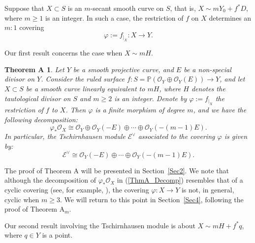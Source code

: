 \documentclass[a4paper,12pt]{amsart}
\newtheorem*{thmA}{Theorem A}
\begin{document}
Suppose that $X \subset S$ is an $m$-secant smooth curve on $S$, that is, $X \sim mY_0 + f^{\ast} D$, where $m \geq 1$ is an integer. In such a case,  the restriction of $f$ on $X$ determines an $m:1$ covering
\begin{equation*}\label{varphi_X_to_Y}
 \varphi := f_{|_X} : X \to Y .
\end{equation*}

Our first result concerns the case when $X \sim mH$.

\begin{thmA}\label{thmARef}
Let $Y$ be a smooth projective curve, and $E$ be a non-special divisor on $Y$. Consider the ruled surface $f : S = \mathbb{P} (\mathcal{O}_Y \oplus \mathcal{O}_Y (E)) \to Y$, and let $X \subset S$ be a smooth curve linearly equivalent to $mH$, where $H$ denotes the tautological divisor on $S$ and $m \geq 2$ is an integer. Denote by $\varphi := f_{|_X}$ the restriction of $f$ to $X$. Then $\varphi$ is a finite morphism of degree $m$, and we have the following decomposition:
 \begin{equation}\label{ThmA_Decomp}
  \varphi_{\ast} \mathcal{O}_X \cong \mathcal{O}_Y \oplus \mathcal{O}_Y (-E)  \oplus \cdots \oplus \mathcal{O}_Y (-(m-1)E) .
 \end{equation}
In particular, the Tschirnhausen module $\mathcal{E}^{\vee}$ associated to the covering $\varphi$ is given by:
\[
 \mathcal{E}^{\vee} \cong \mathcal{O}_Y (-E)  \oplus \cdots \oplus \mathcal{O}_Y (-(m-1)E) .
\]
\end{thmA}

\medskip

The proof of {\rm Theorem A} will be presented in Section~{\ref{Sec2}}. We note that although the decomposition of $\varphi_{\ast} \mathcal{O}_X$ in {\rm (\ref{ThmA_Decomp})} resembles that of a cyclic covering (see, for example, \cite[Remark 4.1.7, p.244]{Laz04}), the covering $\varphi : X \to Y$ is not, in general, cyclic when $m \geq 3$. We will return to this point in Section~{\ref{Sec4}}, following the proof of {\rm Theorem A$_m$}.


Our second result involving the Tschirnhausen module is about $X \sim mH + f^{\ast} q$, where $q \in Y$ is a point.
\end{document}
